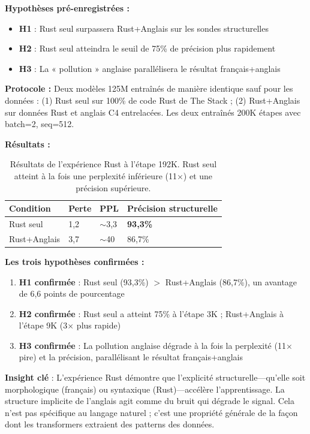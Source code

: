 \documentclass[11pt,a4paper]{article}
\begin{document}
\textbf{Hypothèses pré-enregistrées :}
\begin{itemize}
    \item \textbf{H1} : Rust seul surpassera Rust+Anglais sur les sondes structurelles
    \item \textbf{H2} : Rust seul atteindra le seuil de 75\% de précision plus rapidement
    \item \textbf{H3} : La « pollution » anglaise parallélisera le résultat français+anglais
\end{itemize}

\textbf{Protocole :} Deux modèles 125M entraînés de manière identique sauf pour les données : (1) Rust seul sur 100\% de code Rust de The Stack ; (2) Rust+Anglais sur données Rust et anglais C4 entrelacées. Les deux entraînés 200K étapes avec batch=2, seq=512.

\textbf{Résultats :}

\begin{table}[H]
\centering
\begin{tabular}{llll}
\toprule
Condition & Perte & PPL & Précision structurelle \\
\midrule
Rust seul & 1,2 & $\sim$3,3 & \textbf{93,3\%} \\
Rust+Anglais & 3,7 & $\sim$40 & 86,7\% \\
\bottomrule
\end{tabular}
\caption{Résultats de l'expérience Rust à l'étape 192K. Rust seul atteint à la fois une perplexité inférieure (11$\times$) et une précision supérieure.}
\label{tab:rust}
\end{table}

\textbf{Les trois hypothèses confirmées :}
\begin{enumerate}
    \item \textbf{H1 confirmée} : Rust seul (93,3\%) $>$ Rust+Anglais (86,7\%), un avantage de 6,6 points de pourcentage
    \item \textbf{H2 confirmée} : Rust seul a atteint 75\% à l'étape 3K ; Rust+Anglais à l'étape 9K (3$\times$ plus rapide)
    \item \textbf{H3 confirmée} : La pollution anglaise dégrade à la fois la perplexité (11$\times$ pire) et la précision, parallélisant le résultat français+anglais
\end{enumerate}

\textbf{Insight clé} : L'expérience Rust démontre que l'explicité structurelle---qu'elle soit morphologique (français) ou syntaxique (Rust)---accélère l'apprentissage. La structure implicite de l'anglais agit comme du bruit qui dégrade le signal. Cela n'est pas spécifique au langage naturel ; c'est une propriété générale de la façon dont les transformers extraient des patterns des données.
\end{document}
